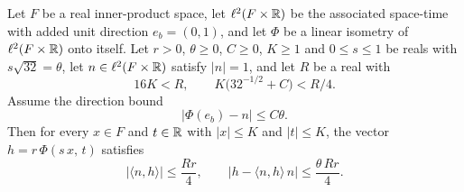 \begin{lemma}
Let $F$ be a real inner-product space, let $\ell^2(F\times\mathbb{R})$ be the associated
space-time with added unit direction $e_b=(0,1)$, and let $\Phi$ be a linear isometry
of $\ell^2(F\times\mathbb{R})$ onto itself. Let $r>0$, $\theta\ge0$, $C\ge0$, $K\ge1$ and
$0\le s\le1$ be reals with $s\sqrt{32}=\theta$, let $n\in\ell^2(F\times\mathbb{R})$ satisfy
$|n|=1$, and let $R$ be a real with
\begin{equation}\label{eq:abo-R}
  16K<R,\qquad K\bigl(32^{-1/2}+C\bigr)<R/4 .
\end{equation}
Assume the direction bound
\begin{equation}\label{eq:abo-dir}
  \bigl|\Phi(e_b)-n\bigr|\le C\theta .
\end{equation}
Then for every $x\in F$ and $t\in\mathbb{R}$ with $|x|\le K$ and $|t|\le K$, the vector
$h=r\,\Phi(s\,x,\,t)$ satisfies
\[
  |\langle n,h\rangle|\le\frac{Rr}4,
  \qquad
  \bigl|h-\langle n,h\rangle\,n\bigr|\le\frac{\theta\,Rr}4 .
\]
\end{lemma}

